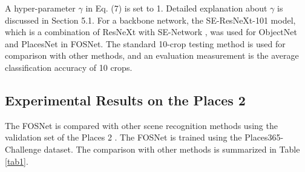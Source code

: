 \documentclass[journal,comsoc]{IEEEtran}
\begin{document}
A hyper-parameter $\gamma$ in Eq. (7) is set to 1. Detailed explanation about $\gamma$ is discussed in Section 5.1. For a backbone network, the SE-ResNeXt-101 model, which is a combination of ResNeXt \cite{b27} with SE-Network \cite{b28}, was used for ObjectNet and PlacesNet in FOSNet. The standard 10-crop testing method \cite{b5} is used for comparison with other methods, and an evaluation measurement is the average classification accuracy of 10 crops.



\subsection{Experimental Results on the Places 2}
\label{s43}
The FOSNet is compared with other scene recognition methods using the validation set of the Places 2 \cite{b20}. The FOSNet is trained using the Places365-Challenge dataset. The comparison with other methods is summarized in Table \ref{tab1}.
\end{document}
